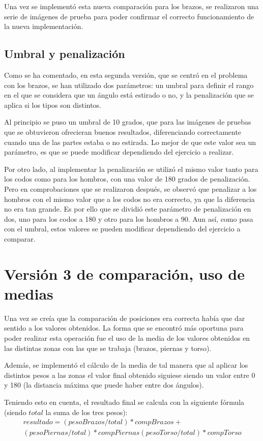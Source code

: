 {Una vez se implementó esta nueva comparación para los brazos, se realizaron una serie de imágenes de prueba para poder confirmar el correcto funcionamiento de la nueva implementación.

\subsection{Umbral y penalización}
Como se ha comentado, en esta segunda versión, que se centró en el problema con los brazos, se han utilizado dos parámetros: un umbral para definir el rango en el que se considera que un ángulo está estirado o no, y la penalización que se aplica si los tipos son distintos.

Al principio se puso un umbral de 10 grados, que para las imágenes de pruebas que se obtuvieron ofrecieran buenos resultados, diferenciando correctamente cuando una de las partes estaba o no estirada. Lo mejor de que este valor sea un parámetro, es que se puede modificar dependiendo del ejercicio a realizar.

Por otro lado, al implementar la penalización se utilizó el mismo valor tanto para los codos como para los hombros, con una valor de 180 grados de penalización. Pero en comprobaciones que se realizaron después, se observó que penalizar a los hombros con el mismo valor que a los codos no era correcto, ya que la diferencia no era tan grande. Es por ello que se dividió este parámetro de penalización en dos, uno para los codos a 180 y otro para los hombros a 90. Aun así, como pasa con el umbral, estos valores se pueden modificar dependiendo del ejercicio a comparar.

\section{Versión 3 de comparación, uso de medias}
Una vez se creía que la comparación de posiciones era correcta había que dar sentido a los valores obtenidos. La forma que se encontró más oportuna para poder realizar esta operación fue el uso de la media de los valores obtenidos en las distintas zonas con las que se trabaja (brazos, piernas y torso).

Además, se implementó el cálculo de la media de tal manera que al aplicar los distintos pesos a las zonas el valor final obtenido siguiese siendo un valor entre 0 y 180 (la distancia máxima que puede haber entre dos ángulos).

Teniendo esto en cuenta, el resultado final se calcula con la siguiente fórmula (siendo $total$ la suma de los tres pesos):
\begin{equation}
\begin{split}
resultado = (pesoBrazos/total)*compBrazos +\\ (pesoPiernas/total)*compPiernas (pesoTorso/total)*compTorso
\end{split}
\end{equation}

}

